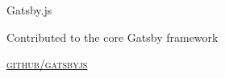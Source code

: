 {
  {\raggedright\large {
    Gatsby.js
  } \\}

  Contributed to the core Gatsby framework

  \textsc{\small\href{http://github.com/gatsbyjs}{github/gatsbyjs}}
} \\

